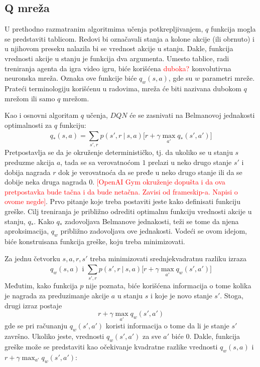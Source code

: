 \subsection{Q mreža}
U prethodno razmatranim algoritmima učenja potkrepljivanjem, $q$ funkcija mogla se predstaviti tablicom. Redovi bi označavali stanja a kolone akcije (ili obrnuto) i u njihovom preseku nalazila bi se vrednost akcije u stanju. Dakle, funkcija vrednosti akcije u stanju je funkcija dva argumenta. Umesto tablice, radi treniranja agenta da igra video igru, biće korišćena \textcolor{red}{duboka?} konvolutivna neuronska mreža. Oznaka ove funkcije biće $q_w(s,a)$, gde su $w$ parametri mreže. Prateći terminologiju korišćenu u radovima, mreža će biti nazivana dubokom $q$ mrežom ili samo $q$ mrežom.
\par 
Kao i osnovni algoritam $q$ učenja, $DQN$ će se zasnivati na Belmanovoj jednakosti optimalnosti za $q$ funkciju:
\begin{equation}
	q_*(s,a) = \sum_{s', r}^{} p(s', r~|~s,a)\big[r + \gamma \max_{a'}q_*(s',a')\big]
\end{equation}
Pretpostavlja se da je okruženje determinističko, tj. da ukoliko se u stanju $s$ preduzme akcija $a$, tada se sa verovatnoćom $1$ prelazi u neko drugo stanje $s'$  i dobija nagrada $r$ dok je verovatnoća da se pređe u neko drugo stanje ili da se dobije neka druga nagrada $0$. \textcolor{red}{[OpenAI Gym okruženje dopušta i da ova pretpostavka bude tačna i da bude netačna. Zavisi od frameskip-a. Napisi o ovome negde]}. Prvo pitanje koje treba postaviti jeste kako definisati funkciju greške. Cilj treniranja je približno odrediti optimalnu funkciju vrednosti akcije u stanju, $q_*$. Kako $q_*$ zadovoljava Belmanove jednakosti, teži se tome da njena aproksimacija, $q_w$ približno zadovoljava ove jednakosti. Vodeći se ovom idejom, biće konstruisana funkcija greške, koju treba minimizovati. 
\par 
Za jednu četvorku $s, a, r, s'$ treba minimizovati srednjekvadratnu razliku izraza
\begin{equation}
	q_w(s,a) \text{~i~} \sum_{s', r}^{} p(s', r~|~s,a)\big[r + \gamma \max_{a'}q_w(s',a')\big]
\end{equation}
Međutim, kako funkcija $p$ nije poznata, biće korišćena informacija o tome kolika je nagrada za preduzimanje akcije $a$ u stanju $s$ i koje je novo stanje $s'$. Stoga, drugi izraz postaje
\begin{equation}
	r + \gamma \max_{a'}q_w(s',a')
\end{equation}
gde se pri računanju $q_w(s',a')$ koristi informacija o tome da li je stanje $s'$ završno. Ukoliko jeste, vrednosti $q_w(s',a')$ za sve $a'$ biće $0$. Dakle, funkcija greške može se predstaviti kao očekivanje kvadratne razlike vrednosti $q_w(s,a)$ i $r + \gamma \max_{a'}q_w(s',a')$:
